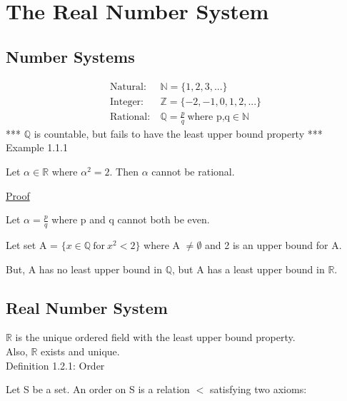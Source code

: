 \newpage
\section[Day 1: The Real Number System]{The Real Number System}





\subsection{Number Systems}

\begin{align*}
	\text{Natural}:\ & \mathbb{N} = \{1, 2, 3, ... \} \\	
	\text{Integer}:\ & \mathbb{Z} = \{-2, -1, 0, 1, 2, ... \} \\
	\text{Rational}:\ & \mathbb{Q} = \frac{p}{q} \ \text{where p,q} \in \mathbb{N}
\end{align*}
*** $\mathbb{Q}$ is countable, but fails to have the least upper bound property *** \\

{ \color{purple} Example 1.1.1 }

	\qquad Let $ \alpha \in \mathbb{R} $ where $ \alpha^2 = 2 $. Then $ \alpha $ cannot be rational.

{ \color{magenta} \underline{Proof} }

	Let $ \alpha = \frac{p}{q} $ where p and q cannot both be even.

	Let set A = $\{ x \in \mathbb{Q} \ \text{for} \ x^2 < 2 \} $ where A $ \neq \emptyset $
	and 2 is an upper bound for A.

	But, A has no least upper bound in $ \mathbb{Q} $,
	but A has a least upper bound in $ \mathbb{R} $.





\subsection{Real Number System}

	$ \mathbb{R} $ is the unique ordered field with the least upper bound property. \\
	Also, $ \mathbb{R} $ exists and unique. \\

{ \color{blue} Definition 1.2.1: Order }

	\qquad Let S be a set. An order on S is a relation $<$ satisfying two axioms:

